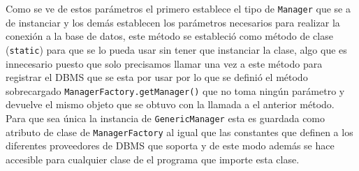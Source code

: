 Como se ve de estos parámetros el primero establece el tipo de \verb=Manager= que se a de instanciar y los demás establecen los parámetros necesarios para realizar la conexión a la base de datos, este método se estableció como método de clase (\verb=static=) para que se lo pueda usar sin tener que instanciar la clase, algo que es innecesario puesto que solo precisamos llamar una vez a este método para registrar el DBMS que se esta por usar por lo que se definió el método sobrecargado \verb=ManagerFactory.getManager()= que no toma ningún parámetro y devuelve el mismo objeto que se obtuvo con la llamada a el anterior método. Para que sea única la instancia de \verb=GenericManager= esta es guardada como atributo de clase de \verb=ManagerFactory= al igual que las constantes que definen a los diferentes proveedores de DBMS que soporta \jj y de este modo además se hace accesible para cualquier clase de el programa que importe esta clase.
%
